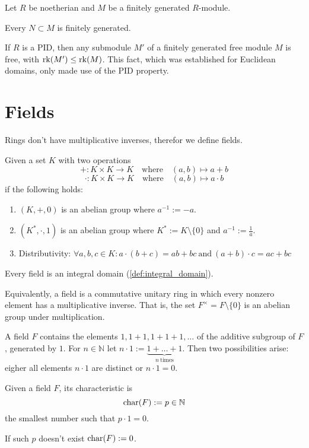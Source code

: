 \begin{proposition}
   Let \(R\) be noetherian and \(M\) be a finitely generated \(R\)-module.

   Every \(N \subset M\) is finitely generated.
\end{proposition}
\begin{remark}
   If \(R\) is a PID, then any submodule \(M'\) of a finitely generated free module \(M\) is free, with \(\operatorname{rk}(M') \leq \operatorname{rk}(M)\).
   This fact, which was established for Euclidean domains, only made use of the PID property.
\end{remark}

\section{Fields}
Rings don't have multiplicative inverses, therefor we define fields.

\begin{definition}[Field]\label{def:field}
   Given a set \(K\) with two operations
   \[+: K \times K \to K \quad\text{where}\quad (a, b) \mapsto a + b\]
   \[\cdot: K \times K \to K \quad\text{where}\quad (a, b) \mapsto a \cdot b\]
   if the following holds:
   \begin{enumerate}[label=\roman*, align=Center]
      \item \((K, +, 0)\) is an abelian group where \(a^{-1} := -a\).
      \item \((K^{*}, \cdot, 1)\) is an abelian group where \(K^{*} := K \setminus \{0\}\) and \(a^{-1} := \frac{1}{a}\).
      \item Distributivity: \(\forall a, b, c \in K: a \cdot (b + c) = ab + bc~\text{and}~(a + b) \cdot c = ac + bc\)
   \end{enumerate}
\end{definition}
\begin{remark}
   Every field is an integral domain (\ref{def:integral_domain}).
\end{remark}
\begin{remark}
   Equivalently, a field is a commutative unitary ring in which every nonzero element has a multiplicative inverse.
   That is, the set \(F^{\times} = F \setminus \{0\}\) is an abelian group under multiplication.
\end{remark}

A field \(F\) contains the elements \(1, 1+1, 1+1+1, \ldots\) of the additive subgroup of \(F\), generated by \(1\).
For \(n \in \mathbb{N}\) let \(n \cdot 1 := \underbrace{1 + \ldots + 1}_{n~\text{times}}\).
Then two possibilities arise: eigher all elements \(n \cdot 1\) are distinct or \(n \cdot 1 = 0\).
\begin{definition}
   Given a field \(F\), its characteristic is
   \[\operatorname{char}(F) := p \in \mathbb{N}\]
   the smallest number such that \(p \cdot 1 = 0\).
\end{definition}
\begin{remark}
   If such \(p\) doesn't exist \(\operatorname{char}(F) := 0\).
\end{remark}

